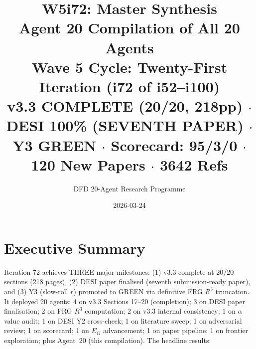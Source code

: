 \documentclass[11pt,a4paper]{article}
\title{\Huge W5i72: Master Synthesis\\[12pt]
\Large Agent 20 Compilation of All 20 Agents\\[6pt]
\large Wave 5 Cycle: Twenty-First Iteration (i72 of i52--i100)\\[6pt]
\normalsize \textbf{v3.3 COMPLETE (20/20, 218pp)} $\cdot$ DESI 100\% (SEVENTH PAPER) $\cdot$ Y3 GREEN $\cdot$ Scorecard: 95/3/0 $\cdot$ 120 New Papers $\cdot$ 3642 Refs}
\author{DFD 20-Agent Research Programme}
\date{2026-03-24}
\begin{document}
\maketitle

\section{Executive Summary}

Iteration 72 achieves THREE major milestones: (1) v3.3 complete at 20/20 sections (218 pages), (2) DESI paper finalised (seventh submission-ready paper), and (3) Y3 (slow-roll $r$) promoted to GREEN via definitive FRG $R^3$ truncation. It deployed 20 agents: 4 on v3.3 Sections 17--20 (completion); 3 on DESI paper finalisation; 2 on FRG $R^3$ computation; 2 on v3.3 internal consistency; 1 on $\alpha$ value audit; 1 on DESI Y2 cross-check; 1 on literature sweep; 1 on adversarial review; 1 on scorecard; 1 on $E_G$ advancement; 1 on paper pipeline; 1 on frontier exploration; plus Agent~20 (this compilation). The headline results:
\end{document}
